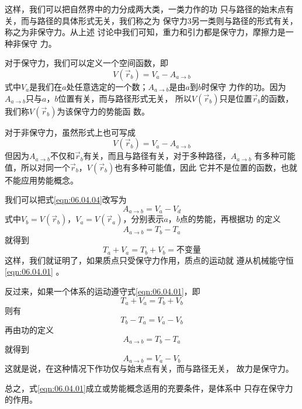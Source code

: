 这样，我们可以把自然界中的力分成两大类，一类力作的功
只与路径的始末点有关，而与路径的具体形式无关，我们称之为
保守力3另一类则与路径的形式有关，称之为非保守力。从上述
讨论中我们可知，重力和引力都是保守力，摩擦力是一种非保守
力。

对于保守力，我们可以定义一个空间函数，即
\begin{equation}\label{eqn:06.04.04}
    V ( \vec{ r } _ { b } ) = V _ { a } - A _ { a \to b }
\end{equation}
式中$ V _ { a } $是我们在$ a $处任意选定的一个数；$ A _ { a \to b } $是由$ a $到$ b $时保守
力作的功。因为$ A _ { a \to b } $只与$ a $，$ b $位置有关，而与路径形式无关，
所以$ V ( \vec{ r } _ { b } ) $只是位置$ \vec{ r } _ { b } $的函数，我们称$ V ( \vec{ r } _ { b } ) $为该保守力的势能函
数。

对于非保守力，虽然形式上也可写成
\begin{equation*}
    V ( \vec{ r } _ { b } ) = V _ { a } - A _ { a \to b }
\end{equation*}
但因为$ A _ { a \to b }  $不仅和$ \vec{ r } _ { b } $有关，而且与路径有关，对于多种路径，$ A _ { a \to b }  $
有多种可能值，所以对同一个$ \vec{ r } _ { b } $，$ V ( \vec{ r } _ { b } ) $也有多种可能值，因此
它并不是位置的函数，也就不能应用势能概念。

我们可以把式\eqref{eqn:06.04.04}改写为
\begin{equation}\label{eqn:06.04.05}
    A _ { a \to b } = V _ { a } - V _ { d }
\end{equation}
式中$ V _ { b } = V ( \vec{ r } _ { b } ) $，$  V _ { a } = V ( \vec{ r } _ { a } ) $，分别表示$ a $，$ b $点的势能，再根据功
的定义
\begin{equation}\label{eqn:06.04.06}
    A _ { a \to b } = T _ { b } - T _ { a }
\end{equation}
就得到
\begin{equation}\label{eqn:06.04.07}
    T _ { a } + V _ { a } = T _ { b } + V _ { b } =  \text{不变量}
\end{equation}
这样，我们就证明了，如果质点只受保守力作用，质点的运动就
遵从机械能守恒\lhbrak \eqref{eqn:06.04.01} \rhbrak 。

反过来，如果一个体系的运动遵守式\eqref{eqn:06.04.01}，即
\begin{equation*}
    T _ { a } + V _ { a } = T _ { b } + V _ { b }
\end{equation*}
则有
\begin{equation*}
    T _ { b } - T _ { a } = V _ { a } - V _ { b }
\end{equation*}
再由功的定义
\begin{equation*}
    A _ { a \to b } = T _ { b } - T _ { a }
\end{equation*}
就得到
\begin{equation*}
    A _ { a \to b } = V _ { a } - V _ { b }
\end{equation*}
这就是说，在这种情况下作功仅与始末点有关，而与路径无关，
故力是保守力。

总之，式\eqref{eqn:06.04.01}成立或势能概念适用的充要条件，是体系中
只存在保守力的作用。